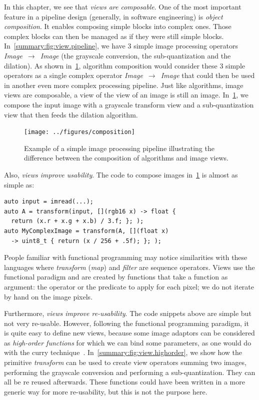 In this chapter, we see that \emph{views are composable}. One of the most important feature in a pipeline design
(generally, in software engineering) is \emph{object composition}. It enables composing simple blocks into complex ones.
Those complex blocks can then be managed as if they were still simple blocks. In~\cref{summary:fig:view.pipeline}, we
have 3 simple image processing operators \emph{Image}~\(\rightarrow\)~\emph{Image} (the grayscale conversion, the
sub-quantization and the dilation). As shown in~\cref{summary:fig:view.comp}, algorithm composition would consider these
3 simple operators as a single complex operator \emph{Image}~\(\rightarrow\)~\emph{Image} that could then be used in
another even more complex processing pipeline. Just like algorithms, image views are composable, \eg a view of the view
of an image is still an image. In~\cref{summary:fig:view.comp}, we compose the input image with a grayscale transform
view and a sub-quantization view that then feeds the dilation algorithm.

\begin{figure}[htbp]
  \centering
  \texttt{[image: ../figures/composition]}
  \caption[]{Example of a simple image processing pipeline illustrating the difference between the composition of
    algorithms and image views.}
  \label{summary:fig:view.comp}
\end{figure}

Also, \emph{views improve usability}. The code to compose images in~\cref{summary:fig:view.comp} is almost as simple as:

\begin{verbatim}
auto input = imread(...);
auto A = transform(input, [](rgb16 x) -> float {
  return (x.r + x.g + x.b) / 3.f; }; );
auto MyComplexImage = transform(A, [](float x)
  -> uint8_t { return (x / 256 + .5f); }; );
\end{verbatim}

People familiar with functional programming may notice similarities with these languages where \emph{transform}
(\emph{map}) and \emph{filter} are sequence operators. Views use the functional paradigm and are created by functions
that take a function as argument: the operator or the predicate to apply for each pixel; we do not iterate by hand on
the image pixels.

Furthermore, \emph{views improve re-usability}. The code snippets above are simple but not very re-usable. However,
following the functional programming paradigm, it is quite easy to define new views, because some image adaptors can be
considered as \emph{high-order functions} for which we can bind some parameters, as one would do with the curry
technique~\parencite{hanus.1995.curry}. In~\cref{summary:fig:view.highorder}, we show how the primitive \emph{transform}
can be used to create view operators summing two images, performing the grayscale conversion and performing a
sub-quantization. They can all be re reused afterwards. These functions could have been written in a more generic way
for more re-usability, but this is not the purpose here.

